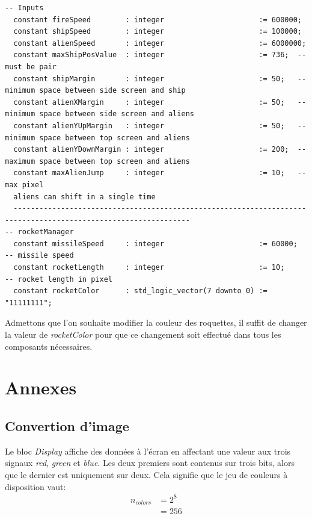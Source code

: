 \documentclass[french]{nakrule}
\begin{document}
\begin{lstlisting}[style=vhdl, caption=Signaux utilisés par \emph{Input} \& \emph{rocketManager}]
-- Inputs
  constant fireSpeed        : integer                      := 600000;
  constant shipSpeed        : integer                      := 100000;
  constant alienSpeed       : integer                      := 6000000;
  constant maxShipPosValue  : integer                      := 736;  -- must be pair
  constant shipMargin       : integer                      := 50;   -- minimum space between side screen and ship
  constant alienXMargin     : integer                      := 50;   -- minimum space between side screen and aliens
  constant alienYUpMargin   : integer                      := 50;   -- minimum space between top screen and aliens
  constant alienYDownMargin : integer                      := 200;  -- maximum space between top screen and aliens
  constant maxAlienJump     : integer                      := 10;   -- max pixel
  aliens can shift in a single time
  ---------------------------------------------------------------------------------------------------------------
-- rocketManager
  constant missileSpeed     : integer                      := 60000;  -- missile speed
  constant rocketLength     : integer                      := 10;     -- rocket length in pixel
  constant rocketColor      : std_logic_vector(7 downto 0) := "11111111";
\end{lstlisting}

Admettons que l'on souhaite modifier la couleur des roquettes, il suffit de changer la valeur de \emph{rocketColor} pour que ce
changement soit effectué dans tous les composants nécessaires. 

\asymmetricalPage
\chapter{Annexes}

\symmetricalPage

\section{Convertion d'image}
\label{sec:convertPicture}

Le bloc \emph{Display} affiche des données à l'écran en affectant une valeur aux
trois signaux \emph{red}, \emph{green} et \emph{blue}. Les deux premiers sont
contenus sur trois bits, alors que le dernier est uniquement sur deux. Cela
signifie que le jeu de couleurs à disposition vaut:
\begin{align*}
  n_{colors} &= 2^{8}\\
             &= 256
\end{align*}
\end{document}
